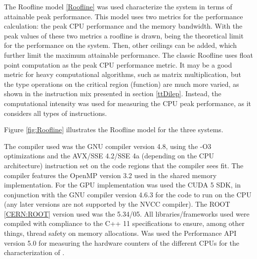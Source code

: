 The Roofline model \ref{Roofline} was used characterize the system in terms of attainable peak performance. This model uses two metrics for the performance calculation: the peak CPU performance and the memory bandwidth. With the peak values of these two metrics a roofline is drawn, being the theoretical limit for the performance on the system. Then, other ceilings can be added, which further limit the maximum attainable performance. The classic Roofline uses float point computation as the peak CPU performance metric. It may be a good metric for heavy computational algorithms, such as matrix multiplication, but the type operations on the critical region (\ttDilepKinFit function) are much more varied, as shown in the instruction mix presented in section \ref{ttDilep}. Instead, the computational intensity was used for measuring the CPU peak performance, as it considers all types of instructions.

Figure \ref{fig:Roofline} illustrates the Roofline model for the three systems.


The compiler used was the GNU compiler version 4.8, using the -O3 optimizations and the AVX/SSE 4.2/SSE 4a (depending on the CPU architecture) instruction set on the code regions that the compiler sees fit. The compiler features the OpenMP version 3.2 used in the shared memory implementation. For the GPU implementation was used the CUDA 5 SDK, in conjunction with the GNU compiler version 4.6.3 for the code to run on the CPU (any later versions are not supported by the \nvidia NVCC compiler). The ROOT \ref{CERN:ROOT} version used was the 5.34/05. All libraries/frameworks used were compiled with compliance to the C++ 11 specifications to ensure, among other things, thread safety on memory allocations. Was used the Performance API version 5.0 for measuring the hardware counters of the different CPUs for the characterization of \ttDilepKinFit.
